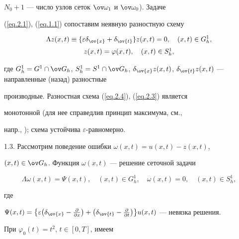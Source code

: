$N_0+1$ --- число узлов сеток $\ov\omega_1$ и $\ov\omega_0$). Задаче


(\ref{eq.2.1}), (\ref{eq.1.1}) сопоставим неявную разностную схему


\begin{equation} \label{eq.2.4}


\begin{array}{c}


\displaystyle


\Lambda z(x, t)\equiv \{\varepsilon \delta_{\ov{x}}+\delta_{\ov{t}}\}


z(x,t)=0, \quad (x, t)\in G^1_h,\\[2mm]


z(x, t)=\varphi(x, t), \quad (x, t)\in S^1_h,


\end{array}


\end{equation}


где $G^1_h=G^1\cap \ov G_h$, $S^1_h=S^1\cap \ov G_h$, $\delta_{\ov{x}} z(x,


t)$, $\delta_{\ov{t}} z(x, t)$ --- направленные (назад) разностные


производные. Разностная схема (\ref{eq.2.4}), (\ref{eq.2.3}) является


монотонной (для нее справедлив принцип максимума, см.,


напр., \cite{2}); схема устойчива $\varepsilon$-равномерно.





1.3. Рассмотрим поведение ошибки $\omega(x,t)=u(x,t)-z(x,t)$,


$(x,t)\in \ov G_h$. Функция $\omega(x, t)$ --- решение сеточной задачи


$$


\Lambda \omega(x, t)=\Psi(x, t), \quad (x, t)\in G^1_h,\quad


\omega(x, t)=0, \quad (x, t)\in S^1_h,


$$


где


$\Psi(x, t)=\big\{\varepsilon \big(\delta_{\ov{x}}-


\frac{\partial}{\partial x}\big)+


\big(\delta_{\ov{t}}-


\frac{\partial}{\partial t}


\big)\big\} u(x, t)$ --- невязка решения.


При $\varphi_0(t)=t^2$, $t\in [0, T]$, имеем


